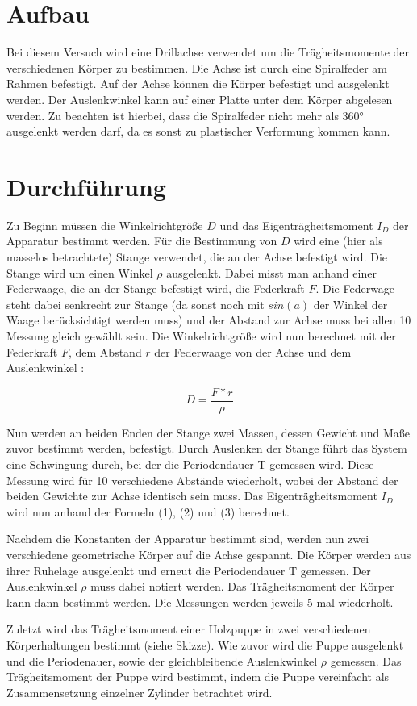 \documentclass{scrartcl}
\begin{document}
\section{Aufbau}

Bei diesem Versuch wird eine Drillachse verwendet um die Trägheitsmomente der verschiedenen Körper zu bestimmen. Die Achse ist durch eine Spiralfeder am Rahmen befestigt. Auf der Achse können die Körper befestigt und ausgelenkt werden. Der Auslenkwinkel kann auf einer Platte unter dem Körper abgelesen werden. Zu beachten ist hierbei, dass die Spiralfeder nicht mehr als 360° ausgelenkt werden darf, da es sonst zu plastischer Verformung kommen kann.

\section{Durchführung}

Zu Beginn müssen die Winkelrichtgröße $D$ und das Eigenträgheitsmoment $I_D$ der Apparatur bestimmt werden. 
Für die Bestimmung von $D$ wird eine (hier als masselos betrachtete) Stange verwendet, die an der Achse befestigt wird. Die Stange wird um einen Winkel $\rho$  ausgelenkt. Dabei misst man anhand einer Federwaage, die an der Stange befestigt wird, die Federkraft $F$. Die Federwage steht dabei senkrecht zur Stange (da sonst noch mit $sin(a)$ der Winkel der Waage berücksichtigt werden muss) und der Abstand zur Achse muss bei allen 10 Messung gleich gewählt sein. Die Winkelrichtgröße wird nun berechnet mit der Federkraft $F$, dem Abstand $r$ der Federwaage von der Achse und dem Auslenkwinkel \rho:

\begin{equation}
	D=\frac{F*r}{\rho}
\end{equation}

Nun werden an beiden Enden der Stange zwei Massen, dessen Gewicht und Maße zuvor bestimmt werden, befestigt. Durch Auslenken der Stange führt das System eine Schwingung durch, bei der die Periodendauer T gemessen wird. Diese Messung wird für 10 verschiedene Abstände wiederholt, wobei der Abstand der beiden Gewichte zur Achse identisch sein muss. Das Eigenträgheitsmoment $I_D$ wird nun anhand der Formeln (1), (2) und (3) berechnet.

Nachdem die Konstanten der Apparatur bestimmt sind, werden nun zwei verschiedene geometrische Körper auf die Achse gespannt. Die Körper werden aus ihrer Ruhelage ausgelenkt und erneut die Periodendauer T gemessen. Der Auslenkwinkel $\rho$ muss dabei notiert werden. Das Trägheitsmoment der Körper kann dann bestimmt werden. Die Messungen werden jeweils 5 mal wiederholt.

Zuletzt wird das Trägheitsmoment einer Holzpuppe in zwei verschiedenen Körperhaltungen bestimmt (siehe Skizze). Wie zuvor wird die Puppe ausgelenkt und die Periodenauer, sowie der gleichbleibende Auslenkwinkel $\rho$ gemessen. Das Trägheitsmoment der Puppe wird bestimmt, indem die Puppe vereinfacht als Zusammensetzung einzelner Zylinder betrachtet wird.
\end{document}
